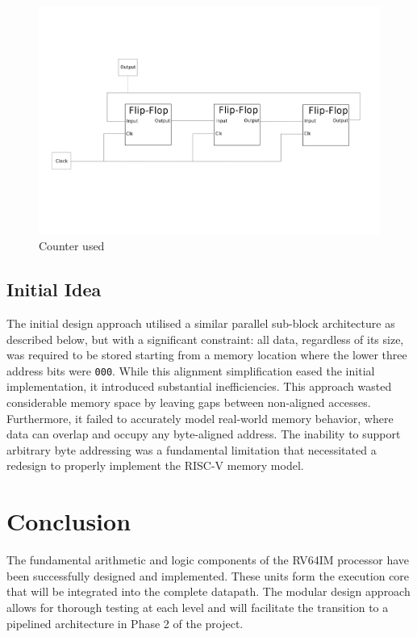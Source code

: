 \documentclass{article}
\begin{document}
\begin{figure}
    \centering
    \includegraphics[width=0.5\linewidth]{FSM.png}
    \caption{Counter used}
    \label{fig:placeholder}
\end{figure}

\subsection*{Initial Idea}
The initial design approach utilised a similar parallel sub-block architecture as described below, but with a significant constraint: all data, regardless of its size, was required to be stored starting from a memory location where the lower three address bits were \texttt{000}. While this alignment simplification eased the initial implementation, it introduced substantial inefficiencies. This approach wasted considerable memory space by leaving gaps between non-aligned accesses. Furthermore, it failed to accurately model real-world memory behavior, where data can overlap and occupy any byte-aligned address. The inability to support arbitrary byte addressing was a fundamental limitation that necessitated a redesign to properly implement the RISC-V memory model.

\section*{Conclusion}

The fundamental arithmetic and logic components of the RV64IM processor have been successfully designed and implemented. These units form the execution core that will be integrated into the complete datapath. The modular design approach allows for thorough testing at each level and will facilitate the transition to a pipelined architecture in Phase 2 of the project.
\end{document}
